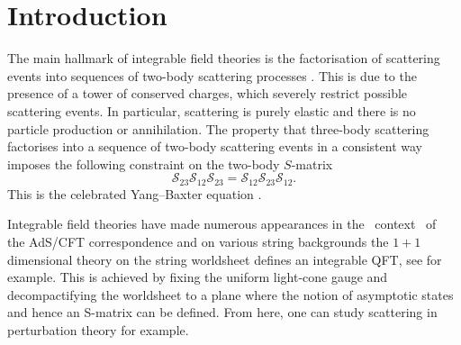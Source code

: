\documentclass[12pt,a4paper]{article}
\numberwithin{equation}{section}
\newcommand{\lS}{\mathcal{S}}
\begin{document}
\tableofcontents
\section{Introduction}

The main hallmark of integrable field theories is the factorisation of scattering events into sequences of two-body scattering processes \cite{ZAMOLODCHIKOV1979253,Zamolodchikov:1990bu}. This is due to the presence of a tower of conserved charges, which severely restrict possible scattering events. In particular, scattering is purely elastic and there is no particle production or annihilation. The property that three-body scattering factorises into a sequence of two-body scattering events in a consistent way  imposes the following constraint on the two-body $S$-matrix 
\begin{equation}
\lS_{23}\lS_{12}\lS_{23}=\lS_{12}\lS_{23}\lS_{12}.
\end{equation}
This is the celebrated Yang--Baxter equation
\cite{Jimbo:1989qm,jimbo1990yang,Perk2006yang}. 


Integrable field theories have made numerous appearances in the $ \, $ context $ \, $ of $ \, $ the 
AdS/CFT correspondence \cite{Maldacena:1998zhr,Witten:1998qj,Klebanov:2004ya} and on various string backgrounds the $1+1$ dimensional theory on the string worldsheet defines an integrable QFT, see for example\cite{Fateev:1996ea,Metsaev:1998it,Beisert:2010jr,Arutyunov:2009ga,Sfondrini:2014via}. This is achieved by fixing the uniform light-cone gauge and decompactifying the worldsheet to a plane where the notion of asymptotic states and hence an S-matrix can be defined. From here, one can study scattering in perturbation theory for example.
\end{document}
